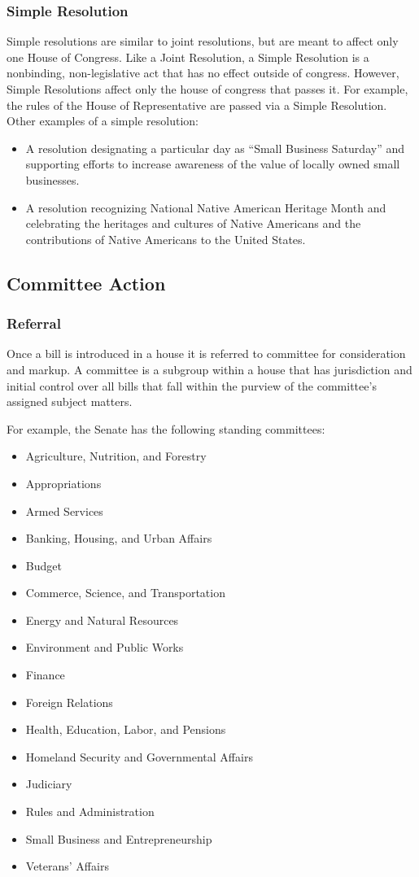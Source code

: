 \subsubsection{Simple Resolution}
Simple resolutions are similar to joint resolutions, but are meant to affect only one House of Congress.
Like a Joint Resolution, a Simple Resolution is a nonbinding, non-legislative act that has no effect outside of congress.
However, Simple Resolutions affect only the house of congress that passes it.
For example, the rules of the House of Representative are passed via a Simple Resolution.
Other examples of a simple resolution:
\begin{itemize}
\item A resolution designating a particular day as ``Small Business Saturday'' and supporting efforts to increase awareness of the value of locally owned small businesses.
\item  A resolution recognizing National Native American Heritage Month and celebrating the heritages and cultures of Native Americans and the contributions of Native Americans to the United States.
\end{itemize}

\subsection{Committee Action}

\subsubsection{Referral}
Once a bill is introduced in a house it is referred to committee for consideration and markup.
A committee is a subgroup within a house that has jurisdiction and initial control over all bills that fall within the purview of the committee's assigned subject matters.

For example, the Senate has the following standing committees:

\begin{itemize}
\item Agriculture, Nutrition, and Forestry 
\item Appropriations 
\item Armed Services 
\item Banking, Housing, and Urban Affairs 
\item Budget 
\item Commerce, Science, and Transportation 
\item Energy and Natural Resources 
\item Environment and Public Works 
\item Finance 
\item Foreign Relations 
\item Health, Education, Labor, and Pensions 
\item Homeland Security and Governmental Affairs 
\item Judiciary 
\item Rules and Administration 
\item Small Business and Entrepreneurship 
\item Veterans' Affairs 
\end{itemize}

